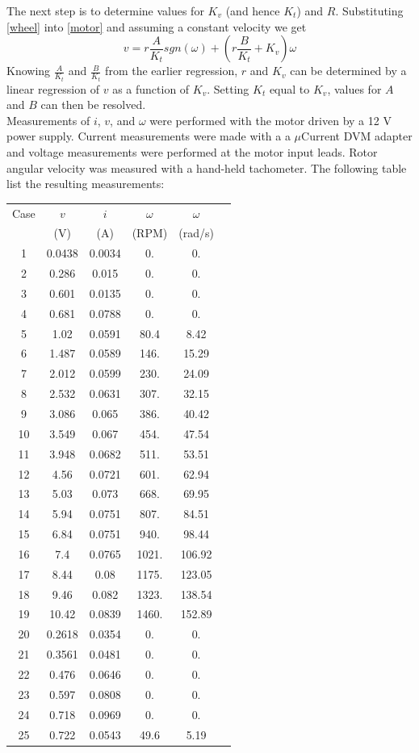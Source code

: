 \documentclass[12pt,letterpaper]{article}
\begin{document}
\begin{appendices}
The next step is to determine values for $K_{v}$ (and hence $K_{t}$) and $R$.  Substituting \eqref{wheel} into \eqref{motor} and assuming a constant velocity we get
\begin{equation}
    v = r\frac{A}{K_{t}}sgn(\omega) + (r\frac{B}{K_{t}}+K_{v}) \omega
\end{equation}
Knowing $\frac{A}{K_{t}}$ and $\frac{B}{K_{t}}$ from the earlier regression, $r$ and $K_{v}$ can be determined by a linear regression of $v$ as a function of $K_{v}$.  Setting $K_{t}$ equal to $K_{v}$, values for $A$ and $B$ can then be resolved.\\

Measurements of $i$, $v$, and $\omega$ were performed with the motor driven by a 12 V power supply.  Current measurements were made with a  a $\mu$Current DVM adapter and voltage measurements were 
performed at the motor input leads.  Rotor angular velocity was measured with a hand-held tachometer.  The following table list the resulting measurements:

\begin{tabular}{|c|c|c|c|cl}
\hline
Case & $v$ & $i$ & $\omega$ & $\omega$ \\
      & (V) &  (A) & (RPM) & (rad/s) \\
\hline
1	& 0.0438	& 0.0034	& 0.	& 0. \\
2	& 0.286	& 0.015	& 0.	& 0. \\
3	& 0.601	& 0.0135	& 0.	& 0. \\
4	& 0.681	& 0.0788	& 0.	& 0. \\
5	& 1.02	& 0.0591	& 80.4	& 8.42 \\
6	& 1.487	& 0.0589	& 146.	& 15.29 \\
7	& 2.012	& 0.0599	& 230.	& 24.09 \\
8	& 2.532	& 0.0631	& 307.	& 32.15 \\
9	& 3.086	& 0.065	& 386.	& 40.42 \\
10	& 3.549	& 0.067	& 454.	& 47.54 \\
11	& 3.948	& 0.0682	& 511.	& 53.51 \\
12	& 4.56	& 0.0721	& 601.	& 62.94 \\
13	& 5.03	& 0.073	& 668.	& 69.95 \\
14	& 5.94	& 0.0751	& 807.	& 84.51 \\
15	& 6.84	& 0.0751	& 940.	& 98.44 \\
16	& 7.4	& 0.0765	& 1021.	& 106.92 \\
17	& 8.44	& 0.08	& 1175.	& 123.05 \\
18	& 9.46	& 0.082	& 1323.	& 138.54 \\
19	& 10.42	& 0.0839	& 1460.	& 152.89 \\
20	& 0.2618	& 0.0354	& 0.	& 0. \\
21	& 0.3561	& 0.0481	& 0.	& 0. \\
22	& 0.476	& 0.0646	& 0.	& 0. \\
23	& 0.597	& 0.0808	& 0.	& 0. \\
24	& 0.718	& 0.0969	& 0.	& 0. \\
25	& 0.722	& 0.0543	& 49.6	& 5.19 \\
\hline
\end{tabular}


\end{appendices}
\end{document}

